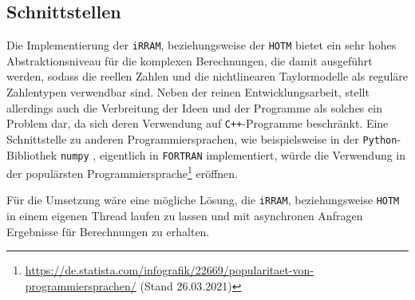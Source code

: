 \subsection*{Schnittstellen}
Die Implementierung der \verb+iRRAM+, beziehungsweise der \verb+HOTM+ bietet ein sehr hohes Abstraktionsniveau für die komplexen Berechnungen, die damit ausgeführt werden, sodass die reellen Zahlen und die nichtlinearen Taylormodelle als reguläre Zahlentypen verwendbar sind. Neben der reinen Entwicklungsarbeit, stellt allerdings auch die Verbreitung der Ideen und der Programme als solches ein Problem dar, da sich deren Verwendung auf \verb.C++.-Programme beschränkt. Eine Schnittstelle zu anderen Programmiersprachen, wie beispielsweise in der \verb+Python+-Bibliothek \verb+numpy+ \cite{harris2020array}, eigentlich in \verb+FORTRAN+ implementiert, würde die Verwendung in der populärsten Programmiersprache\footnote{\url{https://de.statista.com/infografik/22669/popularitaet-von-programmiersprachen/} (Stand 26.03.2021)} eröffnen.  


Für die Umsetzung wäre eine mögliche Lösung, die \verb+iRRAM+, beziehungsweise \verb+HOTM+ in einem eigenen Thread laufen zu lassen und mit asynchronen Anfragen Ergebnisse für Berechnungen zu erhalten.

